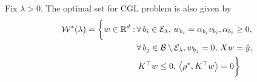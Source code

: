 \begin{proposition}\label{prop:cgl-alternate}
	Fix \( \lambda > 0 \).
	The optimal set for CGL problem is also
	given by
	\begin{equation}\label{eq:sol-fn-cgl-alternate}
		\begin{aligned}
			\mathcal{W}^*(\lambda) =
			\bigg\{ w \in \mathbb{R}^d : \,
			 & \forall \, {b_i} \in {\mathcal{E}_{\lambda}}, \,
			w_{b_i} = \alpha_{b_i} v_{b_i}, \alpha_{b_i} \geq 0, \,                   \\
			 & \forall \, b_j \in \mathcal{B} \setminus {\mathcal{E}_{\lambda}}, w_{b_j} = 0, \,
			X w = \hat y,                                                 \\
			 & \, K^\top w \leq 0, \,
			\left\langle\rho^*, K^\top w\right\rangle = 0
			\bigg\}
		\end{aligned}
	\end{equation}
\end{proposition}

